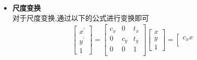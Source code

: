 \documentclass[UTF8,a4paper,10pt]{ctexart}
\begin{document}
\begin{flushleft}
\begin{itemize}
\begin{eqnarray}
\begin{array}{c}
                    1
                \end{array}\right]\nonumber
            \end{eqnarray}
            旋转变换如下图\ref{fig:fig_rotate}所示
            \begin{figure}[htbp]
                \centering
                \caption{图像旋转变换}
                \label{fig:fig_rotate}
            \end{figure}
            \newpage
            \item \textbf{尺度变换}\\
            \hspace{2em}对于尺度变换,通过以下的公式进行变换即可
            \begin{eqnarray}
                \left[\begin{array}{c}
                    x^{\prime}\\
                    y^{\prime}\\
                    1
                \end{array}\right]=\left[\begin{array}{ccc}
                    c_{x} & 0 & t_{x}\\
                    0 & c_{y} & t_{y}\\
                    0 & 0 & 1\\
                \end{array}\right]\left[\begin{array}{c}
                    x\\
                    y\\
                    1
                \end{array}\right]=\left[\begin{array}{c}
                    c_{x}x\\

\end{array}
\end{eqnarray}
\end{itemize}
\end{flushleft}
\end{document}
